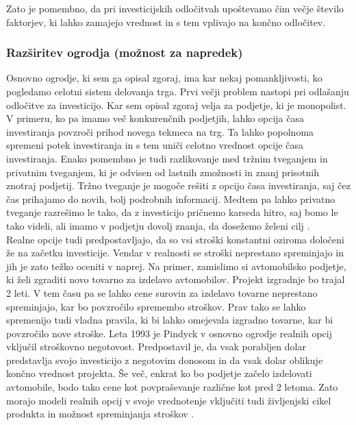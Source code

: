 Zato je pomembno, da pri investicijskih odločitvah upoštevamo čim večje število faktorjev, ki lahko zamajejo vrednost in s tem vplivajo na končno odločitev.   
 
\subsubsection{Razširitev ogrodja (možnost za napredek)}
Osnovno ogrodje, ki sem ga opisal zgoraj, ima kar nekaj pomankljivosti, ko pogledamo celotni sistem delovanja trga. Prvi večji problem nastopi pri odlašanju odločitve za investicijo. Kar sem opisal zgoraj velja za podjetje, ki je monopolist. V primeru, ko pa imamo več konkurenčnih podjetjih, lahko opcija časa investiranja povzroči prihod novega tekmeca na trg. Ta lahko popolnoma spremeni potek investiranja in s tem uniči celotno vrednost opcije časa investiranja. Enako pomembno je tudi razlikovanje med tržnim tveganjem in privatnim tveganjem, ki je odvisen od lastnih zmožnosti in znanj prisotnih znotraj podjetij. Tržno tveganje je mogoče rešiti z opcijo časa investiranja, saj čez čas prihajamo do novih, bolj podrobnih informacij. Medtem pa lahko privatno tveganje razrešimo le tako, da z investicijo pričnemo karseda hitro, saj bomo le tako videli, ali imamo v podjetju dovolj znanja, da dosežemo želeni cilj \cite[str. 38, 39]{Brach}. \\

Realne opcije tudi predpostavljajo, da so vsi stroški konstantni oziroma določeni že na začetku investicije. Vendar v realnosti se stroški neprestano spreminjajo in jih je zato težko oceniti v naprej. Na primer, zamislimo si avtomobilsko podjetje, ki želi zgraditi novo tovarno za izdelavo avtomobilov. Projekt izgradnje bo trajal 2 leti. V tem času pa se lahko cene surovin za izdelavo tovarne neprestano spreminjajo, kar bo povzročilo spremembo stroškov. Prav tako se lahko spremenijo tudi vladna pravila, ki bi lahko omejevala izgradno tovarne, kar bi povzročilo nove stroške. Leta 1993 je Pindyck v osnovno ogrodje realnih opcij vključil stroškovno negotovost. Predpostavil je, da vsak porabljen dolar predstavlja svojo investicijo z negotovim donosom in da vsak dolar oblikuje končno vrednost projekta. Še več, enkrat ko bo podjetje začelo izdelovati avtomobile, bodo tako cene kot povpraševanje različne kot pred 2 letoma. Zato morajo modeli realnih opcij v svoje vrednotenje vključiti tudi življenjski cikel produkta in možnost spreminjanja stroškov \cite[str. 39-42]{Brach}. \\

